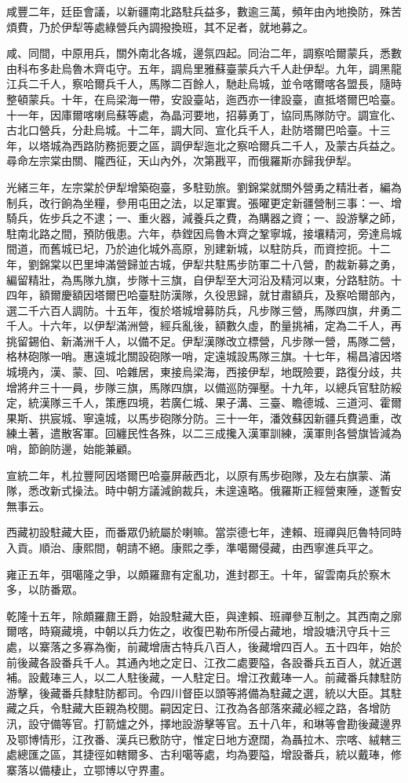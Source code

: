 \begin{pinyinscope}
咸豐二年，廷臣會議，以新疆南北路駐兵益多，數逾三萬，頻年由內地換防，殊苦煩費，乃於伊犁等處綠營兵內調撥換班，其不足者，就地募之。

咸、同間，中原用兵，關外南北各城，邊氛四起。同治二年，調察哈爾蒙兵，悉數由科布多赴烏魯木齊屯守。五年，調烏里雅蘇臺蒙兵六千人赴伊犁。九年，調黑龍江兵二千人，察哈爾兵千人，馬隊二百餘人，馳赴烏城，並令喀爾喀各盟長，隨時整頓蒙兵。十年，在烏梁海一帶，安設臺站，迤西亦一律設臺，直抵塔爾巴哈臺。十一年，因庫爾喀喇烏蘇等處，為晶河要地，招募勇丁，協同馬隊防守。調宣化、古北口營兵，分赴烏城。十二年，調大同、宣化兵千人，赴防塔爾巴哈臺。十三年，以塔城為西路防務扼要之區，調伊犁迤北之察哈爾兵二千人，及蒙古兵益之。尋命左宗棠由關、隴西征，天山內外，次第戡平，而俄羅斯亦歸我伊犁。

光緒三年，左宗棠於伊犁增築砲臺，多駐勁旅。劉錦棠就關外營勇之精壯者，編為制兵，改行餉為坐糧，參用屯田之法，以足軍實。張曜更定新疆營制三事：一、增騎兵，佐步兵之不逮；一、重火器，減養兵之費，為購器之資；一、設游擊之師，駐南北路之間，預防俄患。六年，恭鏜因烏魯木齊之鞏寧城，接壤精河，旁達烏城間道，而舊城已圮，乃於迪化城外高原，別建新城，以駐防兵，而資控扼。十二年，劉錦棠以巴里坤滿營歸並古城，伊犁共駐馬步防軍二十八營，酌裁新募之勇，編留精壯，為馬隊九旗，步隊十三旗，自伊犁至大河沿及精河以東，分路駐防。十四年，額爾慶額因塔爾巴哈臺駐防漢隊，久役思歸，就甘肅額兵，及察哈爾部內，選二千六百人調防。十五年，復於塔城增募防兵，凡步隊三營，馬隊四旗，弁勇二千人。十六年，以伊犁滿洲營，經兵亂後，額數久虛，酌量挑補，定為二千人，再挑留錫伯、新滿洲千人，以備不足。伊犁漢隊改立標營，凡步隊一營，馬隊二營，格林砲隊一哨。惠遠城北關設砲隊一哨，定遠城設馬隊三旗。十七年，楊昌濬因塔城境內，漢、蒙、回、哈雜居，東接烏梁海，西接伊犁，地既險要，路復分歧，共增將弁三十一員，步隊三旗，馬隊四旗，以備巡防彈壓。十九年，以總兵官駐防綏定，統漢隊三千人，策應四境，若廣仁城、果子溝、三臺、瞻德城、三道河、霍爾果斯、拱宸城、寧遠城，以馬步砲隊分防。三十一年，潘效蘇因新疆兵費過重，改練土著，遣散客軍。回纏民性各殊，以二三成攙入漢軍訓練，漢軍則各營旗皆減為哨，節餉防邊，始能兼顧。

宣統二年，札拉豐阿因塔爾巴哈臺屏蔽西北，以原有馬步砲隊，及左右旗蒙、滿隊，悉改新式操法。時中朝方議減餉裁兵，未遑遠略。俄羅斯正經營東陲，遂暫安無事云。

西藏初設駐藏大臣，而番眾仍統屬於喇嘛。當崇德七年，達賴、班禪與厄魯特同時入貢。順治、康熙間，朝請不絕。康熙之季，準噶爾侵藏，由西寧進兵平之。

雍正五年，弭噶隆之爭，以頗羅鼐有定亂功，進封郡王。十年，留雲南兵於察木多，以防番眾。

乾隆十五年，除頗羅鼐王爵，始設駐藏大臣，與達賴、班禪參互制之。其西南之廓爾喀，時窺藏境，中朝以兵力佐之，收復巴勒布所侵占藏地，增設塘汛守兵十三處，以寨落之多寡為衡，前藏增唐古特兵八百人，後藏增四百人。五十四年，始於前後藏各設番兵千人。其通內地之定日、江孜二處要隘，各設番兵五百人，就近選補。設戴琫三人，以二人駐後藏，一人駐定日。增江孜戴琫一人。前藏番兵隸駐防游擊，後藏番兵隸駐防都司。令四川督臣以頭等將備為駐藏之選，統以大臣。其駐藏之兵，令駐藏大臣親為校閱。嗣因定日、江孜為各部落來藏必經之路，各增防汛，設守備等官。打箭爐之外，擇地設游擊等官。五十八年，和琳等會勘後藏邊界及鄂博情形，江孜番、漢兵已敷防守，惟定日地方遼闊，為聶拉木、宗喀、絨轄三處總匯之區，其捷徑如轄爾多、古利噶等處，均為要隘，增設番兵，統以戴琫，修寨落以備棲止，立鄂博以守界畫。


\end{pinyinscope}
